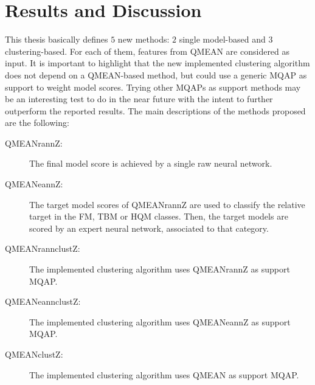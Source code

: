 

\chapter{Results and Discussion}
\label{results}
This thesis basically defines $5$ new methods: $2$ single model-based and $3$ clustering-based. For each of them, features from QMEAN are considered as input. It is important to highlight that the new implemented clustering algorithm does not depend on a QMEAN-based method, but could use a generic MQAP as support to weight model scores. Trying other MQAPs as support methods may be an interesting test to do in the near future with the intent to further outperform the reported results.
The main descriptions of the methods proposed are the following:
\begin{description}
	\item[QMEANrannZ:] The final model score is achieved by a single raw neural network.
	\item[QMEANeannZ:] The target model scores of QMEANrannZ are used to classify the relative target in the FM, TBM or HQM classes. Then, the target models are scored by an expert neural network, associated to that category.
	\item[QMEANrannclustZ:] The implemented clustering algorithm uses QMEANrannZ as support MQAP.
	\item[QMEANeannclustZ:] The implemented clustering algorithm uses QMEAN\-eannZ as support MQAP.
	\item[QMEANclustZ:] The implemented clustering algorithm uses QMEAN as support MQAP.
\end{description}

